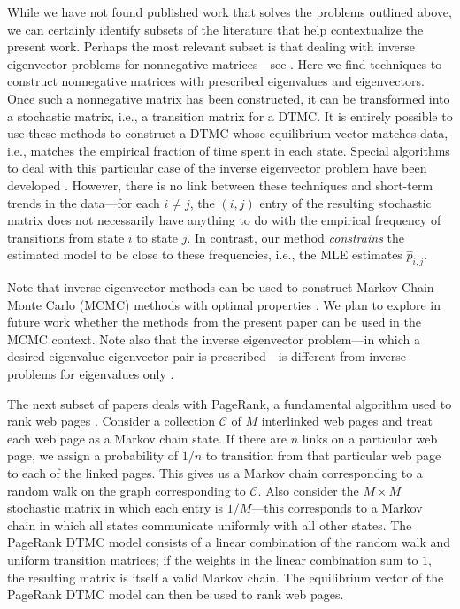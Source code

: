 \documentclass[review,letterpaper,11pt]{elsarticle}
\begin{document}
While we have not found published work that solves the problems outlined above, we can certainly identify subsets of the literature that help contextualize the present work.  Perhaps the most relevant subset is that dealing with inverse eigenvector problems for nonnegative matrices---see \cite{chu1998numerical,chu2005inverse,bai2012nonnegative}.  Here we find techniques to construct nonnegative matrices with prescribed eigenvalues and eigenvectors.  Once such a nonnegative matrix has been constructed, it can be transformed into a stochastic matrix, i.e., a transition matrix for a DTMC.  It is entirely possible to use these methods to construct a DTMC whose equilibrium vector matches data, i.e., matches the empirical fraction of time spent in each state.  Special algorithms to deal with this particular case of the inverse eigenvector problem have been developed \cite{KTVVwsdm15, maystre2015fast}.  However, there is no link between these techniques and short-term trends in the data---for each $i \neq j$, the $(i,j)$ entry of the resulting stochastic matrix does not necessarily have anything to do with the empirical frequency of transitions from state $i$ to state $j$.  In contrast, our method \emph{constrains} the estimated model to be close to these frequencies, i.e., the MLE estimates $\widehat{p}_{i,j}$.

Note that inverse eigenvector methods can be used to construct Markov Chain Monte Carlo (MCMC) methods with optimal properties \cite{Chu2015}.  We plan to explore in future work whether the methods from the present paper can be used in the MCMC context.  Note also that the inverse eigenvector problem---in which a desired eigenvalue-eigenvector pair is prescribed---is different from inverse problems for eigenvalues only \cite{Laurie1991, chen2011isospectral, yao2016riemannian}.  

The next subset of papers deals with PageRank, a fundamental algorithm used to rank web pages \cite{Langville2006}.  Consider a collection $\mathcal{C}$ of $M$ interlinked web pages and treat each web page as a Markov chain state.  If there are $n$ links on a particular web page, we assign a probability of $1/n$ to transition from that particular web page to each of the linked pages.  This gives us a Markov chain corresponding to a random walk on the graph corresponding to $\mathcal{C}$.  Also consider the $M \times M$ stochastic matrix in which each entry is $1/M$---this corresponds to a Markov chain in which all states communicate uniformly with all other states.  The PageRank DTMC model consists of a linear combination of the random walk and uniform transition matrices; if the weights in the linear combination sum to $1$, the resulting matrix is itself a valid Markov chain.  The equilibrium vector of the PageRank DTMC model can then be used to rank web pages.
\end{document}
